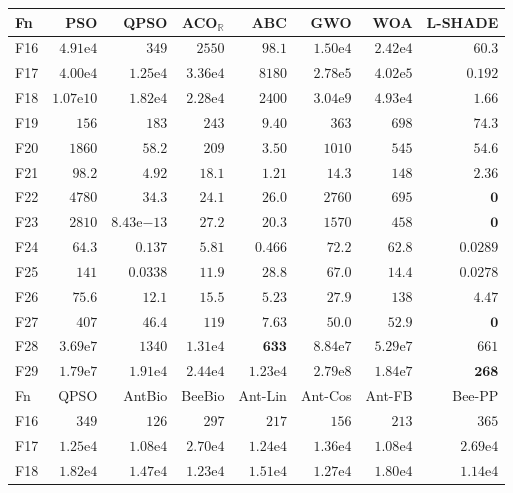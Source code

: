 \begin{tabular}{lrrrrrrr}
\toprule
Fn & PSO & QPSO & ACO$_\mathbb{R}$ & ABC & GWO & WOA & L-SHADE \\
\midrule
F16 & $4.91\mathrm{e}{4}$ & $349$ & $2550$ & $98.1$ & $1.50\mathrm{e}{4}$ & $2.42\mathrm{e}{4}$ & $\mathbf{60.3}$ \\
F17 & $4.00\mathrm{e}{4}$ & $1.25\mathrm{e}{4}$ & $3.36\mathrm{e}{4}$ & $8180$ & $2.78\mathrm{e}{5}$ & $4.02\mathrm{e}{5}$ & $\mathbf{0.192}$ \\
F18 & $1.07\mathrm{e}{10}$ & $1.82\mathrm{e}{4}$ & $2.28\mathrm{e}{4}$ & $2400$ & $3.04\mathrm{e}{9}$ & $4.93\mathrm{e}{4}$ & $\mathbf{1.66}$ \\
F19 & $156$ & $183$ & $243$ & $\mathbf{9.40}$ & $363$ & $698$ & $74.3$ \\
F20 & $1860$ & $58.2$ & $209$ & $\mathbf{3.50}$ & $1010$ & $545$ & $54.6$ \\
F21 & $98.2$ & $4.92$ & $18.1$ & $\mathbf{1.21}$ & $14.3$ & $148$ & $2.36$ \\
F22 & $4780$ & $34.3$ & $24.1$ & $26.0$ & $2760$ & $695$ & $\mathbf{0}$ \\
F23 & $2810$ & $8.43\mathrm{e}{-13}$ & $27.2$ & $20.3$ & $1570$ & $458$ & $\mathbf{0}$ \\
F24 & $64.3$ & $0.137$ & $5.81$ & $0.466$ & $72.2$ & $62.8$ & $\mathbf{0.0289}$ \\
F25 & $141$ & $0.0338$ & $11.9$ & $28.8$ & $67.0$ & $14.4$ & $\mathbf{0.0278}$ \\
F26 & $75.6$ & $12.1$ & $15.5$ & $5.23$ & $27.9$ & $138$ & $\mathbf{4.47}$ \\
F27 & $407$ & $46.4$ & $119$ & $7.63$ & $50.0$ & $52.9$ & $\mathbf{0}$ \\
F28 & $3.69\mathrm{e}{7}$ & $1340$ & $1.31\mathrm{e}{4}$ & $\mathbf{633}$ & $8.84\mathrm{e}{7}$ & $5.29\mathrm{e}{7}$ & $661$ \\
F29 & $1.79\mathrm{e}{7}$ & $1.91\mathrm{e}{4}$ & $2.44\mathrm{e}{4}$ & $1.23\mathrm{e}{4}$ & $2.79\mathrm{e}{8}$ & $1.84\mathrm{e}{7}$ & $\mathbf{268}$ \\
\midrule
Fn & QPSO & AntBio & BeeBio & Ant-Lin & Ant-Cos & Ant-FB & Bee-PP \\
\midrule
F16 & $349$ & $126$ & $297$ & $217$ & $156$ & $213$ & $365$ \\
F17 & $1.25\mathrm{e}{4}$ & $1.08\mathrm{e}{4}$ & $2.70\mathrm{e}{4}$ & $1.24\mathrm{e}{4}$ & $1.36\mathrm{e}{4}$ & $1.08\mathrm{e}{4}$ & $2.69\mathrm{e}{4}$ \\
F18 & $1.82\mathrm{e}{4}$ & $1.47\mathrm{e}{4}$ & $1.23\mathrm{e}{4}$ & $1.51\mathrm{e}{4}$ & $1.27\mathrm{e}{4}$ & $1.80\mathrm{e}{4}$ & $1.14\mathrm{e}{4}$ \\

\end{tabular}
